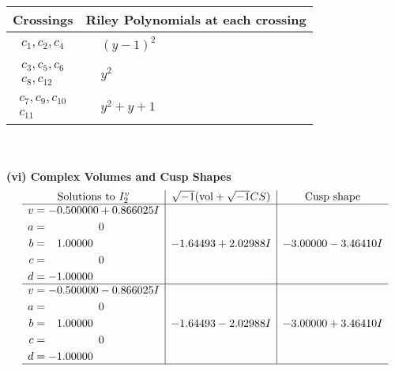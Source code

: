 \documentclass[1p]{elsarticle_modified}
\theoremstyle{definition}
\newcommand{\I}{\sqrt{-1}}
\begin{document}
\begin{tabular}{m{50pt}|m{274pt}}
Crossings & \hspace{64pt}Riley Polynomials at each crossing \\
\hline $$\begin{aligned}c_{1},c_{2},c_{4}\end{aligned}$$&$\begin{aligned}
&(y-1)^2
\end{aligned}$\\
\hline $$\begin{aligned}c_{3},c_{5},c_{6}\\c_{8},c_{12}\end{aligned}$$&$\begin{aligned}
&y^2
\end{aligned}$\\
\hline $$\begin{aligned}c_{7},c_{9},c_{10}\\c_{11}\end{aligned}$$&$\begin{aligned}
&y^2+y+1
\end{aligned}$\\
\hline
\end{tabular}\\~\\
\newpage\flushleft \textbf{(vi) Complex Volumes and Cusp Shapes}
$$\begin{array}{c|c|c}  
\text{Solutions to }I^v_{2}& \I (\text{vol} + \sqrt{-1}CS) & \text{Cusp shape}\\
 \hline 
\begin{aligned}
v &= -0.500000 + 0.866025 I \\
a &= \phantom{-0.000000 } 0 \\
b &= \phantom{-}1.00000\phantom{ +0.000000I} \\
c &= \phantom{-0.000000 } 0 \\
d &= -1.00000\phantom{ +0.000000I}\end{aligned}
 & -1.64493 + 2.02988 I & -3.00000 - 3.46410 I \\ \hline\begin{aligned}
v &= -0.500000 - 0.866025 I \\
a &= \phantom{-0.000000 } 0 \\
b &= \phantom{-}1.00000\phantom{ +0.000000I} \\
c &= \phantom{-0.000000 } 0 \\
d &= -1.00000\phantom{ +0.000000I}\end{aligned}
 & -1.64493 - 2.02988 I & -3.00000 + 3.46410 I\\
 \hline 
 \end{array}$$\newpage\newpage\renewcommand{\arraystretch}{1}
\end{document}
